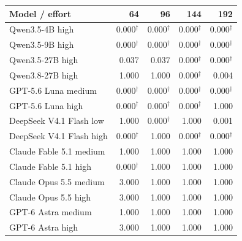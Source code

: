 \begin{tabularx}{\linewidth}{@{}Xrrrr@{}}
\toprule
Model / effort & 64 & 96 & 144 & 192 \\
\midrule
Qwen3.5-4B high & 0.000$^{\dagger}$ & 0.000$^{\dagger}$ & 0.000$^{\dagger}$ & 0.000$^{\dagger}$ \\
Qwen3.5-9B high & 0.000$^{\dagger}$ & 0.000$^{\dagger}$ & 0.000$^{\dagger}$ & 0.000$^{\dagger}$ \\
Qwen3.5-27B high & 0.037 & 0.037 & 0.000$^{\dagger}$ & 0.000$^{\dagger}$ \\
Qwen3.8-27B high & 1.000 & 1.000 & 0.000$^{\dagger}$ & 0.004 \\
GPT-5.6 Luna medium & 0.000$^{\dagger}$ & 0.000$^{\dagger}$ & 0.000$^{\dagger}$ & 0.000$^{\dagger}$ \\
GPT-5.6 Luna high & 0.000$^{\dagger}$ & 0.000$^{\dagger}$ & 0.000$^{\dagger}$ & 1.000 \\
DeepSeek V4.1 Flash low & 1.000 & 0.000$^{\dagger}$ & 1.000 & 0.001 \\
DeepSeek V4.1 Flash high & 0.000$^{\dagger}$ & 1.000 & 0.000$^{\dagger}$ & 0.000$^{\dagger}$ \\
Claude Fable 5.1 medium & 1.000 & 1.000 & 1.000 & 1.000 \\
Claude Fable 5.1 high & 0.000$^{\dagger}$ & 1.000 & 1.000 & 1.000 \\
Claude Opus 5.5 medium & 3.000 & 1.000 & 1.000 & 1.000 \\
Claude Opus 5.5 high & 3.000 & 1.000 & 1.000 & 1.000 \\
GPT-6 Astra medium & 1.000 & 1.000 & 1.000 & 1.000 \\
GPT-6 Astra high & 3.000 & 1.000 & 1.000 & 1.000 \\
\bottomrule
\end{tabularx}
